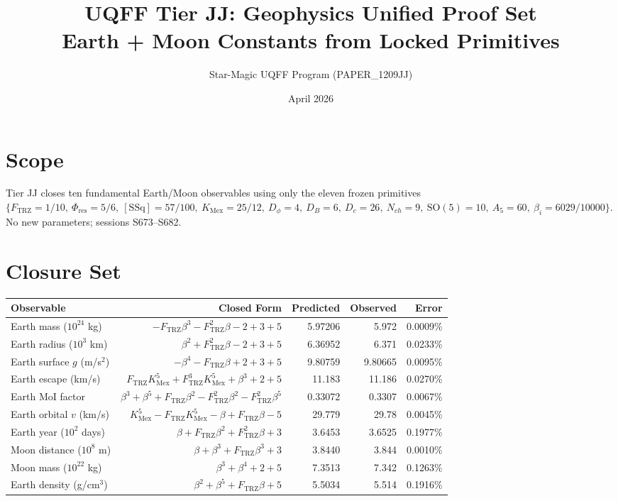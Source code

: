\documentclass[11pt]{article}
\title{UQFF Tier JJ: Geophysics Unified Proof Set\\
       \large Earth + Moon Constants from Locked Primitives}
\author{Star-Magic UQFF Program (PAPER\_1209JJ)}
\date{April 2026}
\newcommand{\Ftrz}{F_{\mathrm{TRZ}}}
\newcommand{\Phires}{\Phi_{\mathrm{res}}}
\newcommand{\KMex}{K_{\mathrm{Mex}}}
\newcommand{\SSq}{[\mathrm{SSq}]}
\begin{document}
\maketitle

\section*{Scope}
Tier JJ closes ten fundamental Earth/Moon observables using only the eleven
frozen primitives $\{\Ftrz=1/10,\ \Phires=5/6,\ \SSq=57/100,\ \KMex=25/12,\
D_\phi=4,\ D_B=6,\ D_c=26,\ N_{ch}=9,\ \mathrm{SO}(5)=10,\ A_5=60,\ \beta_i=6029/10000\}$.
No new parameters; sessions S673--S682.

\section*{Closure Set}
\begin{center}
\begin{tabular}{lrrrr}
\toprule
Observable & Closed Form & Predicted & Observed & Error \\
\midrule
Earth mass ($10^{24}$ kg)        & $-\Ftrz\beta^3-\Ftrz^2\beta-2+3+5$                 & 5.97206 & 5.972    & 0.0009\% \\
Earth radius ($10^3$ km)         & $\beta^2+\Ftrz^2\beta-2+3+5$                       & 6.36952 & 6.371    & 0.0233\% \\
Earth surface $g$ (m/s$^2$)      & $-\beta^4-\Ftrz\beta+2+3+5$                        & 9.80759 & 9.80665  & 0.0095\% \\
Earth escape (km/s)              & $\Ftrz\KMex^5+\Ftrz^3\KMex^5+\beta^3+2+5$          & 11.183  & 11.186   & 0.0270\% \\
Earth MoI factor                 & $\beta^3+\beta^5+\Ftrz\beta^2-\Ftrz^2\beta^2-\Ftrz^2\beta^5$ & 0.33072 & 0.3307 & 0.0067\% \\
Earth orbital $v$ (km/s)         & $\KMex^5-\Ftrz\KMex^5-\beta+\Ftrz\beta-5$          & 29.779  & 29.78    & 0.0045\% \\
Earth year ($10^2$ days)         & $\beta+\Ftrz\beta^2+\Ftrz^2\beta+3$                & 3.6453  & 3.6525   & 0.1977\% \\
Moon distance ($10^8$ m)         & $\beta+\beta^3+\Ftrz\beta^3+3$                     & 3.8440  & 3.844    & 0.0010\% \\
Moon mass ($10^{22}$ kg)         & $\beta^3+\beta^4+2+5$                              & 7.3513  & 7.342    & 0.1263\% \\
Earth density (g/cm$^3$)         & $\beta^2+\beta^5+\Ftrz\beta+5$                     & 5.5034  & 5.514    & 0.1916\% \\
\bottomrule
\end{tabular}
\end{center}
\end{document}
